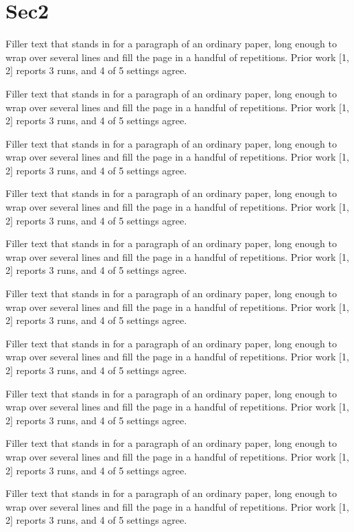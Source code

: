 \documentclass{article}
\begin{document}
\section{Sec2}
Filler text that stands in for a paragraph of an ordinary paper, long enough to wrap over several lines and fill the page in a handful of repetitions. Prior work [1, 2] reports 3 runs, and 4 of 5 settings agree.\par
Filler text that stands in for a paragraph of an ordinary paper, long enough to wrap over several lines and fill the page in a handful of repetitions. Prior work [1, 2] reports 3 runs, and 4 of 5 settings agree.\par
Filler text that stands in for a paragraph of an ordinary paper, long enough to wrap over several lines and fill the page in a handful of repetitions. Prior work [1, 2] reports 3 runs, and 4 of 5 settings agree.\par
Filler text that stands in for a paragraph of an ordinary paper, long enough to wrap over several lines and fill the page in a handful of repetitions. Prior work [1, 2] reports 3 runs, and 4 of 5 settings agree.\par
Filler text that stands in for a paragraph of an ordinary paper, long enough to wrap over several lines and fill the page in a handful of repetitions. Prior work [1, 2] reports 3 runs, and 4 of 5 settings agree.\par
Filler text that stands in for a paragraph of an ordinary paper, long enough to wrap over several lines and fill the page in a handful of repetitions. Prior work [1, 2] reports 3 runs, and 4 of 5 settings agree.\par
Filler text that stands in for a paragraph of an ordinary paper, long enough to wrap over several lines and fill the page in a handful of repetitions. Prior work [1, 2] reports 3 runs, and 4 of 5 settings agree.\par
Filler text that stands in for a paragraph of an ordinary paper, long enough to wrap over several lines and fill the page in a handful of repetitions. Prior work [1, 2] reports 3 runs, and 4 of 5 settings agree.\par
Filler text that stands in for a paragraph of an ordinary paper, long enough to wrap over several lines and fill the page in a handful of repetitions. Prior work [1, 2] reports 3 runs, and 4 of 5 settings agree.\par
Filler text that stands in for a paragraph of an ordinary paper, long enough to wrap over several lines and fill the page in a handful of repetitions. Prior work [1, 2] reports 3 runs, and 4 of 5 settings agree.\par
\end{document}
